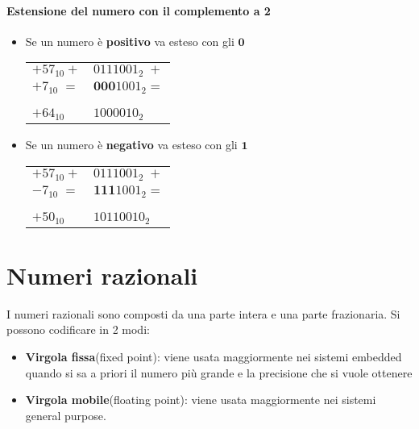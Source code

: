 \documentclass[a4paper]{article}
\theoremstyle{break}
\theoremstyle{break}
\theoremstyle{break}
\theoremstyle{break}
\begin{document}
\paragraph{Estensione del numero con il complemento a 2}
\begin{itemize}
	\item Se un numero è \textbf{positivo} va esteso con gli \( \textbf{0} \)
	      \begin{center}
		      \begin{tabular}{l|l}                                        \\
			      \( +57_{10}+ \)  & \( 0111001_2\;+ \)        \\
			      \( +7_{10}\;= \) & \( \textbf{000}1001_2= \) \\ \\
			      \hline                                       \\
			      \( +64_{10} \)   & \( 1000010_2 \)
		      \end{tabular}
	      \end{center}
	\item Se un numero è \textbf{negativo} va esteso con gli \( \textbf{1} \)
	      \begin{center}
		      \begin{tabular}{l|l}                                        \\
			      \( +57_{10}+ \)  & \( 0111001_2\;+ \)        \\
			      \( -7_{10}\;= \) & \( \textbf{111}1001_2= \) \\ \\
			      \hline                                       \\
			      \( +50_{10} \)   & \( 10110010_2 \)
		      \end{tabular}
	      \end{center}
\end{itemize}

\section{Numeri razionali}
I numeri razionali sono composti da una parte intera e una parte frazionaria.
Si possono codificare in 2 modi:
\begin{itemize}
	\item \textbf{Virgola fissa}(fixed point): viene usata maggiormente nei
	      sistemi embedded quando si sa a priori il numero più grande e la
	      precisione che si vuole ottenere
	\item \textbf{Virgola mobile}(floating point): viene usata maggiormente
	      nei sistemi general purpose.
\end{itemize}
\end{document}
